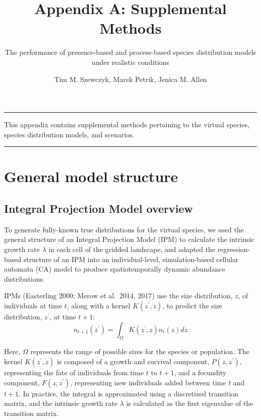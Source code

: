 \documentclass[]{article}
\title{Appendix A: Supplemental Methods}
\subtitle{The performance of presence-based and process-based species distribution
models under realistic conditions}
\author{Tim M. Szewczyk, Marek Petrik, Jenica M. Allen}
\date{}
\begin{document}
\maketitle

{
\setcounter{tocdepth}{1}
\tableofcontents
}
\setcounter{table}{0}  \renewcommand{\thetable}{A.\arabic{table}} \setcounter{figure}{0} \renewcommand{\thefigure}{A.\arabic{figure}}

\begin{center}\rule{0.5\linewidth}{\linethickness}\end{center}

This appendix contains supplemental methods pertaining to the virtual
species, species distribution models, and scenarios.

\begin{center}\rule{0.5\linewidth}{\linethickness}\end{center}

\section{General model structure}
\subsection{Integral Projection Model overview}

To generate fully-known true distributions for the virtual species, we
used the general structure of an Integral Projection Model (IPM) to
calculate the intrinsic growth rate \(\lambda\) in each cell of the
gridded landscape, and adapted the regression-based structure of an IPM
into an individual-level, simulation-based cellular automata (CA) model
to produce spatiotemporally dynamic abundance distributions.

IPMs (Easterling 2000; Merow et al.~2014, 2017) use the size
distribution, \(z\), of individuals at time \(t\), along with a kernel
\(K(z^{\prime}, z)\), to predict the size distribution, \(z^{\prime}\),
at time \(t+1\): \begin{equation}
n_{t+1}(z^{\prime}) = \int_{\Omega} K(z^{\prime}, z) n_t(z) dz
\end{equation}

Here, \(\Omega\) represents the range of possible sizes for the species
or population. The kernel \(K(z^{\prime}, z)\) is composed of a growth
and survival component, \(P(z, z^{\prime})\), representing the fate of
individuals from time \(t\) to \(t+1\), and a fecundity component,
\(F(z, z^{\prime})\), representing new individuals added between time
\(t\) and \(t+1\). In practice, the integral is approximated using a
discretized transition matrix, and the intrinsic growth rate \(\lambda\)
is calculated as the first eigenvalue of the transition matrix.
\end{document}
